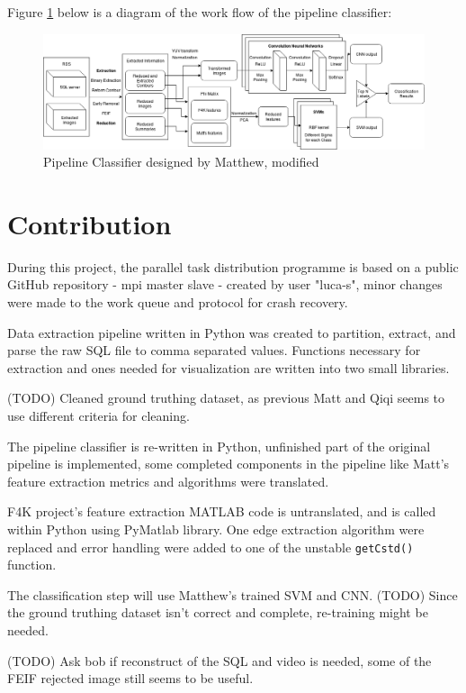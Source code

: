\documentclass[bsc,logo,twoside,fullspacing,parskip]{infthesis}
\begin{document}
Figure \ref{fig:pipeline} below is a diagram of the work flow of the pipeline classifier:

\begin{figure}[!b]
    \centering
    \includegraphics[scale=0.34]{graph/Pipeline_Classifier.png}
    \caption{Pipeline Classifier designed by Matthew, modified}
    \label{fig:pipeline}
\end{figure}

\section{Contribution}

During this project, the parallel task distribution programme is based on a public GitHub repository - mpi master slave - created by user "luca-s"\cite{L5}, minor changes were made to the work queue and protocol for crash recovery.

Data extraction pipeline written in Python was created to partition, extract, and parse the raw SQL file to comma separated values.
Functions necessary for extraction and ones needed for visualization are written into two small libraries. 

(TODO) Cleaned ground truthing dataset, as previous Matt and Qiqi seems to use different criteria for cleaning.

The pipeline classifier is re-written in Python, unfinished part of the original pipeline is implemented, some completed components in the pipeline like Matt's feature extraction metrics and algorithms were translated.

F4K project's feature extraction MATLAB code is untranslated, and is called within Python using PyMatlab library. One edge extraction algorithm were replaced and error handling were added to one of the unstable {\tt getCstd()} function. 

The classification step will use Matthew's trained SVM and CNN. (TODO) Since the ground truthing dataset isn't correct and complete, re-training might be needed.

(TODO) Ask bob if reconstruct of the SQL and video is needed, some of the FEIF rejected image still seems to be useful.
\end{document}
